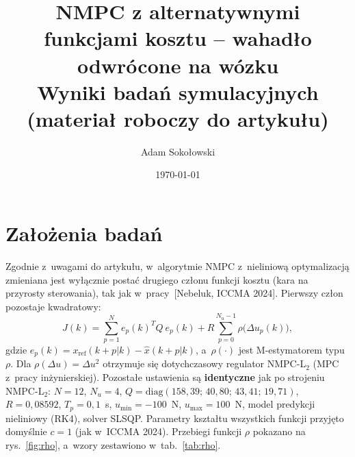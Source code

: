 \documentclass[a4paper,10pt]{article}
\title{NMPC z alternatywnymi funkcjami kosztu -- wahadło odwrócone na wózku\\[2pt]
\large Wyniki badań symulacyjnych (materiał roboczy do artykułu)}
\author{Adam Sokołowski}
\date{\today}
\begin{document}
\maketitle

\section{Założenia badań}

Zgodnie z~uwagami do artykułu, w~algorytmie NMPC z~nieliniową optymalizacją zmieniana jest
wyłącznie postać drugiego członu funkcji kosztu (kara na przyrosty sterowania), tak jak
w~pracy~[Nebeluk, ICCMA 2024]. Pierwszy człon pozostaje kwadratowy:
\begin{equation}
J(k)=\sum_{p=1}^{N}e_{p}(k)^{T}Q~e_{p}(k)+R\sum_{p=0}^{N_{u}-1}\rho\bigl(\Delta u_{p}(k)\bigr),
\label{eq:J}
\end{equation}
gdzie $e_p(k)=x_\mathrm{ref}(k+p|k)-\hat{x}(k+p|k)$, a~$\rho(\cdot)$ jest M-estymatorem
typu $\rho$. Dla $\rho(\Delta u)=\Delta u^2$ otrzymuje się dotychczasowy regulator NMPC-L$_2$
(MPC z~pracy inżynierskiej). Pozostałe ustawienia są \textbf{identyczne} jak po strojeniu
NMPC-L$_2$: $N=12$, $N_u=4$, $Q=\mathrm{diag}(158{,}39;\,40{,}80;\,43{,}41;\,19{,}71)$,
$R=0{,}08592$, $T_p=0{,}1$~s, $u_\mathrm{min}=-100$~N, $u_\mathrm{max}=100$~N, model predykcji
nieliniowy (RK4), solver SLSQP. Parametry kształtu wszystkich funkcji przyjęto domyślnie
$c=1$ (jak w~ICCMA 2024). Przebiegi funkcji $\rho$ pokazano na rys.~\ref{fig:rho}, a~wzory
zestawiono w~tab.~\ref{tab:rho}.
\end{document}
